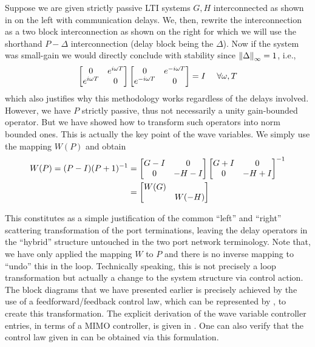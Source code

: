 Suppose we are given strictly passive LTI systems $G,H$ interconnected as shown in  on the 
left with communication delays. We, then, rewrite the interconnection as a two block interconnection as shown on 
the right for which we will use the shorthand $P-\Delta$ interconnection (delay block being the $\Delta$). Now if 
the system was small-gain we would directly conclude with stability since $\displaystyle \left\| \Delta \right\|_\infty = 1$, i.e.,
\[
\begin{bmatrix}0 &e^{i\omega T}\\e^{i\omega T}&0\end{bmatrix}\begin{bmatrix}0 &e^{-i\omega T}\\e^{-i\omega T}&0\end{bmatrix}= I \quad \ \forall\omega,T 
\]
which also justifies why this methodology works regardless of the delays involved. However, we have $P$ strictly 
passive, thus not necessarily a unity gain-bounded operator. But we have showed how to transform 
such operators into norm bounded ones. This is actually the key point of the wave variables. We simply use the mapping 
$W(P)$ and obtain 
\begin{align}
W(P) = (P-I)(P+1)^{-1} &= \begin{bmatrix}G-I & 0\\0 &-H-I\end{bmatrix}\begin{bmatrix}G+I & 0\\0 &-H+I\end{bmatrix}^{-1}\\ &= \begin{bmatrix}W(G) &\\&W(-H)\end{bmatrix}
\end{align}

This constitutes as a simple justification of the common \enquote{left} and \enquote{right} scattering transformation of the port terminations, leaving 
the delay operators in the \enquote{hybrid} structure untouched in the two port network terminology. Note that, we have only applied the mapping $W$ to $P$ and 
there is no inverse mapping to \enquote{undo} this in the loop. Technically speaking, this is not precisely a loop transformation 
but actually a change to the system structure via control action. The block diagrams that we have presented earlier is precisely 
achieved by the use of a feedforward/feedback control law, which can be represented by , to create this 
transformation. The explicit derivation of the wave variable controller entries, in terms of a MIMO controller, is given in 
\cite{christiansson2008}. One can also verify that the control law given in \cite{andersonspong} can be obtained via this formulation. 

